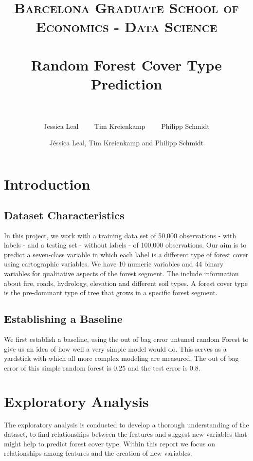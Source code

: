 \documentclass[paper=a4, fontsize=11pt]{scrartcl}
\title{	
\normalfont \normalsize 
\textsc{Barcelona Graduate School of Economics - Data Science} \\ [25pt]
\horrule{2pt} \\[0.5cm] 
\huge Random Forest Cover Type Prediction  \\ 
\horrule{2pt} \\[0.5cm] 
}
\author{Jessica Leal \  \ \ \ Tim Kreienkamp \  \  \  \ Philipp Schmidt}
\author{J\'essica Leal, Tim Kreienkamp and Philipp Schmidt}
\date{}
\numberwithin{equation}{section}
\numberwithin{figure}{section}
\numberwithin{table}{section}
\begin{document}


\maketitle





\section{Introduction}
\subsection{Dataset Characteristics}
In this project, we work with a training data set of 50,000 observations - with labels - and a testing set - without labels - of 100,000 observations. Our aim is to predict a seven-class variable in which each label is a different type of forest cover using cartographic variables. We have 10 numeric variables and 44 binary variables for qualitative aspects of the forest segment. The include information about fire, roads, hydrology, elevation and different soil types. 
A forest cover type is the pre-dominant type of tree that grows in a specific forest segment. 

\subsection{Establishing a Baseline}
We first establish a baseline, using the out of bag error untuned random Forest to give us an idea of how well a very simple model would do. This serves as a yardstick with which all more complex modeling are measured.
The out of bag error of this simple random forest is 0.25 and the test error is 0.8.


\section{Exploratory Analysis}

The exploratory analysis is conducted to develop a thorough understanding of the dataset, to find relationships between the features and suggest new variables that might help to predict forest cover type. Within this report we focus on relationships among features and the creation of new variables.
\end{document}
